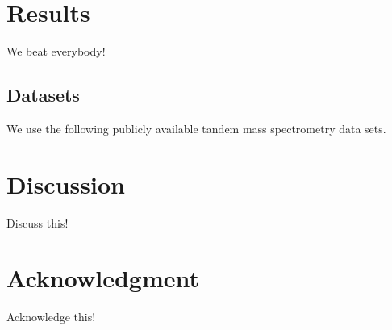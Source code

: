 \documentclass{bioinfo}
\begin{document}
\section{Results}

We beat everybody!

\subsection*{Datasets}
We use the following publicly available tandem mass spectrometry data sets.

\section{Discussion}
Discuss this!

\section*{Acknowledgment}

Acknowledge this!





 
\end{document}
